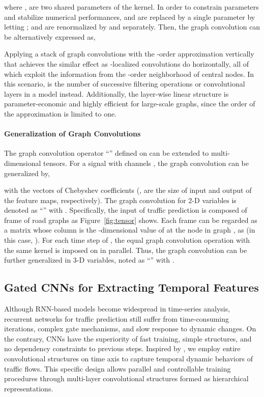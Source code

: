\documentclass{article}
\begin{document}
where ,  are two shared parameters of the kernel. In order to constrain parameters and stabilize numerical performances,  and  are replaced by a single parameter  by letting ;  and  are renormalized by  and  separately. Then, the graph convolution can be alternatively expressed as, 

Applying a stack of graph convolutions with the -order approximation vertically that achieves the similar effect as -localized convolutions do horizontally, all of which exploit the information from the -order neighborhood of central nodes. In this scenario,  is the number of successive filtering operations or convolutional layers in a model instead. Additionally, the layer-wise linear structure is parameter-economic and highly efficient for large-scale graphs, since the order of the approximation is limited to one.

\paragraph{Generalization of Graph Convolutions} 
The graph convolution operator ``'' defined on  can be extended to multi-dimensional tensors. For a signal with  channels , the graph convolution can be generalized by,

with the  vectors of Chebyshev coefficients  (,  are the size of input and output of the feature maps, respectively). The graph convolution for 2-D variables is denoted as ``'' with . Specifically, the input of traffic prediction is composed of  frame of road graphs as Figure~\ref{fig:tensor} shows. Each frame  can be regarded as a matrix whose column  is the -dimensional value of  at the  node in graph , as  (in this case, ). For each time step  of , the equal graph convolution operation with the same kernel  is imposed on  in parallel. Thus, the graph convolution can be further generalized in 3-D variables, noted as ``'' with .

\subsection{Gated CNNs for Extracting Temporal Features}
Although RNN-based models become widespread in time-series analysis, recurrent networks for traffic prediction still suffer from time-consuming iterations, complex gate mechanisms, and slow response to dynamic changes. On the contrary, CNNs have the superiority of fast training, simple structures, and no dependency constraints to previous steps. Inspired by \cite{gehring2017convolutional}, we employ entire convolutional structures on time axis to capture temporal dynamic behaviors of traffic flows. This specific design allows parallel and controllable training procedures through multi-layer convolutional structures formed as hierarchical representations.
\end{document}
